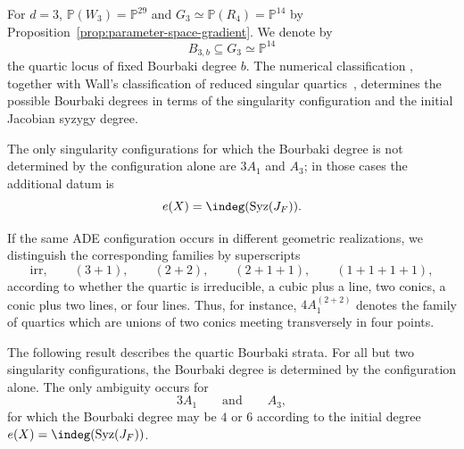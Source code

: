 \documentclass[11pt]{amsart} %
\theoremstyle{definition}
\def\syz{\mbox{\rm Syz}}
\def\NZQ{\mathbb}               %
\def\PP{{\NZQ P}}
\begin{document}
For $d=3$, \(\PP(W_3)=\PP^{29}\) and \(G_3\simeq\PP(R_4)=\PP^{14}\) by Proposition~\ref{prop:parameter-space-gradient}. We denote by
\[
B_{3,b}\subseteq G_3\simeq\PP^{14}
\]
the quartic locus of fixed Bourbaki degree $b$.
The numerical classification
\cite[Theorem~4.1]{JMNRS2026}, together with Wall's classification
of reduced singular quartics~\cite{Wall-quartics}, determines the
possible Bourbaki degrees in terms of the singularity configuration
and the initial Jacobian syzygy degree.

The only singularity configurations for which the Bourbaki degree is
not determined by the configuration alone are $3A_1$ and $A_3$;
in those cases the additional datum is
\[
e(X)=\indeg(\syz(J_F)).
\]

If the same ADE configuration occurs in different geometric realizations, we distinguish the corresponding families by superscripts
\[
\mathrm{irr},\qquad (3+1),\qquad (2+2),\qquad (2+1+1),\qquad (1+1+1+1),
\]
according to whether the quartic is irreducible, a cubic plus a line, two conics, a conic plus two lines, or four lines. Thus, for instance, $4A_1^{(2+2)}$ denotes the family of quartics which are unions of two conics meeting transversely in four points.

The following result describes the quartic Bourbaki strata. For all
but two singularity configurations, the Bourbaki degree is determined
by the configuration alone. The only ambiguity occurs for
\[
3A_1
\qquad\text{and}\qquad
A_3,
\]
for which the Bourbaki degree may be $4$ or $6$ according to the
initial degree \(e(X)=\indeg(\syz(J_F))\).
\end{document}
